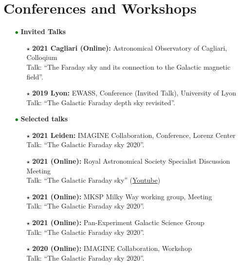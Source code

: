 \documentclass[11pt,a4paper,sans, table, dvipsnames]{moderncv}        %
\begin{document}
\vspace{\baselineskip}
\section{Conferences and Workshops}
\begin{itemize}
\item[\textcolor{Green}{$\bullet$}] {\textbf{Invited Talks}}
  \vspace{0.2\baselineskip}
\begin{itemize}
  \item[\textcolor{Black}{$\star$}]{\textbf{2021 Cagliari (Online):} Astronomical Observatory of Cagliari, Colloqium\\ Talk: ``The Faraday sky and its connection to the Galactic magnetic field''.}
  \item[\textcolor{Black}{$\star$}]{\textbf{2019 Lyon:} EWASS, Conference (Invited Talk), University of Lyon \\ Talk: ``The Galactic Faraday depth sky revisited''.}
\end{itemize}
  \vspace{0.4\baselineskip}
\item[\textcolor{Green}{$\bullet$}] {\textbf{Selected talks}}
  \vspace{0.2\baselineskip}
  \begin{itemize}
    \item[\textcolor{Black}{$\star$}]{\textbf{2021 Leiden:} IMAGINE Collaboration, Conference, Lorenz Center\\ Talk: ``The Galactic Faraday sky 2020''.}

    \item[\textcolor{Black}{$\star$}]{\textbf{2021 (Online):} Royal Astronomical Society Specialist Discussion Meeting\\ Talk: ``The Galactic Faraday sky'' (\href{https://www.youtube.com/watch?v=1HM33vWJbUM}{Youtube})}

    \item[\textcolor{Black}{$\star$}]{\textbf{2021 (Online):} MKSP Milky Way working group, Meeting\\ Talk: ``The Galactic Faraday sky 2020''.}

    \item[\textcolor{Black}{$\star$}]{\textbf{2021 (Online):} Pan-Experiment Galactic Science Group\\ Talk: ``The Galactic Faraday sky 2020''.}

    \item[\textcolor{Black}{$\star$}]{\textbf{2020 (Online):} IMAGINE Collaboration, Workshop\\ Talk: ``The Galactic Faraday sky 2020''.}


\end{itemize}
\end{itemize}
\end{document}
